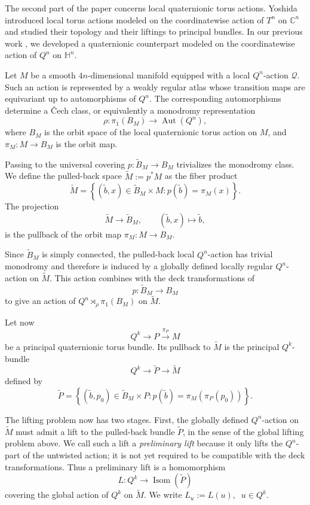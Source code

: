 \documentclass[11pt,a4paper]{article}
\numberwithin{equation}{section}
\theoremstyle{named}
\begin{document}
The second part of the paper concerns local quaternionic torus actions. Yoshida~\cite{Yoshida2,Yoshida1} introduced local torus actions modeled on the coordinatewise action of \(T^n\) on \(\mathbb C^n\) and studied their topology and their liftings to principal bundles. In our previous work \cite{bg25,bg_top}, we developed a quaternionic counterpart modeled on the coordinatewise action of \(Q^n\) on \( \mathbb H^n\).

Let \(M\) be a smooth \(4n\)-dimensional manifold equipped with a local \(Q^n\)-action \(\mathcal Q\). Such an action is represented by a weakly regular atlas whose transition maps are equivariant up to automorphisms of \(Q^n\). The corresponding automorphisms determine a \v{C}ech class, or equivalently a monodromy representation
\[
\rho:\pi_1(B_M)\longrightarrow\operatorname{Aut}(Q^n),
\]
where \(B_M\) is the orbit space of the local quaternionic torus action on \(M\), and \(\pi_M:M\longrightarrow B_M\) is the orbit map.

Passing to the universal covering \(p:\widetilde B_M\longrightarrow B_M\) trivializes the monodromy class. We define the pulled-back space \(\widetilde M:=p^*M\) as the fiber product
\[
\widetilde M=\left\{ (\widetilde b,x)\in \widetilde B_M\times M:p(\widetilde b)=\pi_M(x)\right\}.
\]
The projection
\[
\widetilde M\longrightarrow \widetilde B_M,
\qquad
(\widetilde b,x)\longmapsto \widetilde b,
\]
is the pullback of the orbit map \(\pi_M:M\to B_M\).

Since \(\widetilde B_M\) is simply connected, the pulled-back local \(Q^n\)-action has trivial monodromy and therefore is induced by a globally defined locally regular \(Q^n\)-action on \(\widetilde M\). This action combines with the deck transformations of
\[
p:\widetilde B_M\longrightarrow B_M
\]
to give an action of \(Q^n\rtimes_\rho\pi_1(B_M)\) on \(\widetilde M\).

Let now
\[
Q^k\longrightarrow P\overset{\pi_P}{\longrightarrow}M
\]
be a principal quaternionic torus bundle. Its pullback to \(\widetilde M\) is the principal \(Q^k\)-bundle
\[
Q^k\longrightarrow \widetilde P\longrightarrow \widetilde M
\]
defined by
\[
\widetilde P=\left\{ (\widetilde b,p_0)\in \widetilde B_M\times P:p(\widetilde b)=\pi_M(\pi_P(p_0))
\right\}.
\]

The lifting problem now has two stages. First, the globally defined \(Q^n\)-action on \(\widetilde M\) must admit a lift to the pulled-back bundle \(\widetilde P\), in the sense of the global lifting problem above. We call such a lift a \emph{preliminary lift} because it only lifts the \(Q^n\)-part of the untwisted action; it is not yet required to be compatible with the deck transformations. Thus a preliminary lift is a homomorphism \[ L:Q^k\longrightarrow\operatorname{Isom}(\widetilde P) \] covering the global action of \(Q^k\) on \(\widetilde M\). We write $L_u:=L(u),\;\; u\in Q^k$.
\end{document}
